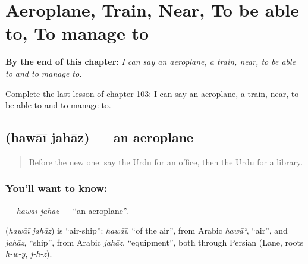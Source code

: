 
\chapter{Aeroplane, Train, Near, To be able to, To manage to}
\label{ch:ur-aeroplane-train-near-to-be-able-to-to-manage-to}

\begin{chapteropening}
\textbf{By the end of this chapter:} \emph{I can say an aeroplane, a train, near, to be able to and to manage to.}

Complete the last lesson of chapter 103: I can say an aeroplane, a train, near, to be able to and to manage to.
\end{chapteropening}

\section[\texorpdfstring{\ur{ہوائی} \ur{جہاز} (hawāī jahāz)}{ہوائی جہاز (hawāī jahāz)}]{  (hawāī jahāz) — an aeroplane}

\label{lesson:UR-C103-hawaijahaz}



\begin{quote}
Before the new one: say the Urdu for an office, then the Urdu for a library.
\end{quote}

\subsection*{You'll want to know:  }
\textbf{ } — \emph{hawāī jahāz} — \textquotedblleft{}an aeroplane\textquotedblright{}.

\begin{cousinweb}
\textbf{ } (\emph{hawāī jahāz}) is \textquotedblleft{}air-ship\textquotedblright{}: \emph{hawāī}, \textquotedblleft{}of the air\textquotedblright{}, from Arabic \emph{hawāʾ}, \textquotedblleft{}air\textquotedblright{}, and \emph{jahāz}, \textquotedblleft{}ship\textquotedblright{}, from Arabic \emph{jahāz}, \textquotedblleft{}equipment\textquotedblright{}, both through Persian (Lane, roots \emph{h-w-y}, \emph{j-h-z}).
\end{cousinweb}

